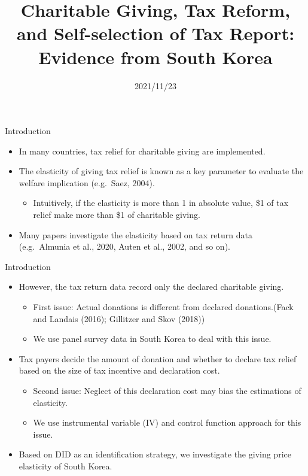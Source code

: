 \documentclass[
  ignorenonframetext,
  aspectratio=169,
]{beamer}
\title{Charitable Giving, Tax Reform, and Self-selection of Tax Report: Evidence from South Korea  }
\author[shortname]{ Hiroki Kato \inst{1} \and  Tsuyoshi Goto \inst{2} \and  Yong-Rok Kim \inst{3} \and }
\institute[shortinst]{ \inst{1} Osaka University \and  \inst{2} Chiba University \and  \inst{3} Kansai University \and }
\date{2021/11/23}
\providecommand{\tightlist}{%
  \setlength{\itemsep}{0pt}\setlength{\parskip}{0pt}}
\begin{document}
\frame{\titlepage}

\begin{frame}{Introduction}
\protect\hypertarget{introduction}{}
\begin{itemize}
\tightlist
\item
  In many countries, tax relief for charitable giving are implemented.
\item
  The elasticity of giving tax relief is known as a key parameter to evaluate the welfare implication (e.g.~Saez, 2004).

  \begin{itemize}
  \tightlist
  \item
    Intuitively, if the elasticity is more than 1 in absolute value, \$1 of tax relief make more than \$1 of charitable giving.
  \end{itemize}
\item
  Many papers investigate the elasticity based on tax return data (e.g.~Almunia et al., 2020, Auten et al., 2002, and so on).
\end{itemize}
\end{frame}

\begin{frame}{Introduction}
\protect\hypertarget{introduction-1}{}
\begin{itemize}
\tightlist
\item
  However, the tax return data record only the declared charitable giving.

  \begin{itemize}
  \tightlist
  \item
    First issue: Actual donations is different from declared donations.(Fack and Landais (2016); Gillitzer and Skov (2018))
  \item
    We use panel survey data in South Korea to deal with this issue.
  \end{itemize}
\item
  Tax payers decide the amount of donation and whether to declare tax relief based on the size of tax incentive and declaration cost.

  \begin{itemize}
  \tightlist
  \item
    Second issue: Neglect of this declaration cost may bias the estimations of elasticity.
  \item
    We use instrumental variable (IV) and control function approach for this issue.
  \end{itemize}
\item
  Based on DID as an identification strategy, we investigate the giving price elasticity of South Korea.
\end{itemize}
\end{frame}
\end{document}

